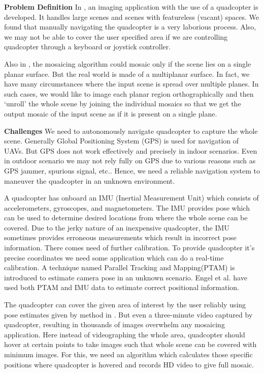 \textbf{Problem Definition}
In \cite{Prasad16},  an imaging application with the use of a quadcopter is
developed. It handles large scenes and scenes with featureless (vacant) spaces.
We found that manually navigating the quadcopter is a very laborious process.
Also, we may not be able to cover the user specified area if we are controlling
quadcopter through a keyboard or joystick controller.

Also in \cite{Prasad16}, the mosaicing algorithm could
mosaic only if the scene lies on a single planar surface. But the real world is 
made of a multiplanar surface. In fact, we have many circumstances where the
input scene is spread over multiple planes. In such cases, we would like to
image each planar region orthographically and then `unroll' the whole scene by joining the
individual mosaics so that we get the output mosaic of the input scene as if it
is present on a single plane.
 
\textbf{Challenges}
We need to autonomously navigate quadcopter to capture the whole scene. Generally
Global Positioning System (GPS) is used for navigation of UAVs.
But GPS does not work effectively and precisely in indoor scenarios. Even in outdoor
scenario we may not rely fully on GPS due to various reasons such as GPS
jammer, spurious signal, etc.. Hence, we need a reliable navigation system to
maneuver the quadcopter in an unknown environment.

A quadcopter has onboard an IMU (Inertial Measurement Unit)  which consists of
accelerometers, gyroscopes, and magnetometers. The IMU provides pose which can be
used to   determine desired locations from where the whole scene can be covered.
Due to the  jerky nature of an inexpensive quadcopter, the IMU sometimes
provides erroneous measurements  which result in incorrect pose information. There comes need of
further calibration.  To provide quadcopter it’s precise coordinates we need
some application which can do a real-time calibration.
A technique named Parallel Tracking and Mapping(PTAM) \cite{klein} is introduced
to estimate camera pose in an unknown scenario.
Engel et al. \cite{engel} have used both PTAM and IMU data to estimate  correct
positional information.

The quadcopter can cover the given area of interest by the user reliably using pose
estimates given by method in \cite{engel}. But even a three-minute video
captured by quadcopter, resulting in thousands of images overwhelm any mosaicing
application. Here instead of videographing the whole area, quadcopter should
hover at certain points to take images such that whole scene can be covered with
minimum images. For this, we need an algorithm which calculates those
specific positions  where quadcopter is hovered and records HD video to give
full mosaic.


